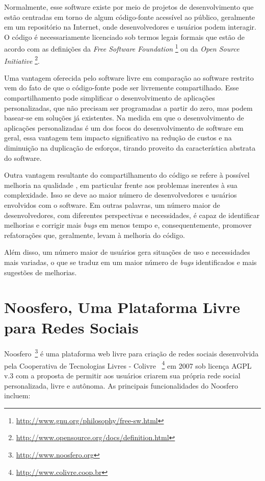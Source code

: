 Normalmente, esse software existe por meio de projetos de desenvolvimento
que estão centradas em torno de algum código-fonte acessível ao público,
geralmente em um repositório na Internet, onde desenvolvedores e usuários
podem interagir.
%
O código é necessariamente licenciado sob termos legais formais que estão de
acordo com as definições da \textit{Free Software Foundation}
\footnote{\url{http://www.gnu.org/philosophy/free-sw.html}} ou da
\textit{Open Source Initiative}
\footnote{\url{http://www.opensource.org/docs/definition.html}}.


Uma vantagem oferecida pelo software livre em comparação ao software
restrito vem do fato de que o código-fonte pode ser livremente compartilhado.
%
Esse compartilhamento pode simplificar o desenvolvimento de aplicações
personalizadas, que não precisam ser programadas a partir do zero, mas
podem basear-se em soluções já existentes.
%
Na medida em que o desenvolvimento de aplicações personalizadas é um dos focos do
desenvolvimento de software em geral, essa vantagem tem impacto significativo na
redução de custos e na diminuição na duplicação de esforços, tirando proveito da
característica abstrata do software.

Outra vantagem resultante do compartilhamento do código se refere
à possível melhoria na qualidade \cite{CatedralBazzar}, em particular frente aos
problemas inerentes à sua complexidade.
%
Isso se deve ao maior número de desenvolvedores e usuários envolvidos
com o software. Em outras palavras, um número maior de desenvolvedores, com diferentes
perspectivas e necessidades, é capaz de identificar melhorias e corrigir
mais \emph{bugs} em menos tempo e, consequentemente, promover refatorações que,
geralmente, levam à melhoria do código.

%
Além disso, um número maior de usuários gera situações de uso e
necessidades mais variadas, o que se traduz em um maior número
de \emph{bugs} identificados e mais sugestões de melhorias.


\section{Noosfero, Uma Plataforma Livre para Redes Sociais}
\label{noosfero-section}

Noosfero~\footnote{\url{http://www.noosfero.org}}
é uma  plataforma web livre para criação de redes sociais desenvolvida
pela Cooperativa de Tecnologias Livres - Colivre
~\footnote{\url{http://www.colivre.coop.br}} 
em 2007 sob licença AGPL v.3 com a proposta de permitir aos usuários criarem sua
própria rede social personalizada, livre e autônoma.
%
As principais funcionalidades do Noosfero incluem:

